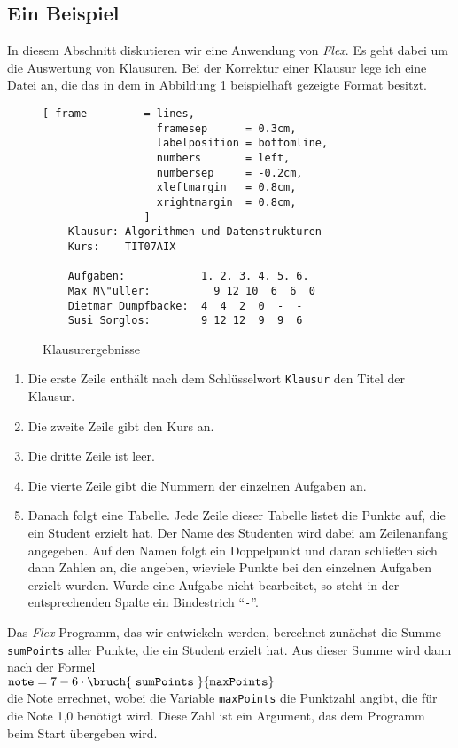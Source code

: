 \subsection{Ein Beispiel}
In diesem Abschnitt diskutieren wir eine Anwendung von \textsl{Flex}.  Es geht dabei um die
Auswertung von Klausuren.   Bei der Korrektur einer Klausur lege ich eine Datei an, die das in dem
in Abbildung \ref{fig:ergebnis} beispielhaft gezeigte Format besitzt.

\begin{figure}[!h]
\centering
\begin{Verbatim}[ frame         = lines, 
                  framesep      = 0.3cm, 
                  labelposition = bottomline,
                  numbers       = left,
                  numbersep     = -0.2cm,
                  xleftmargin   = 0.8cm,
                  xrightmargin  = 0.8cm,
                ]
    Klausur: Algorithmen und Datenstrukturen
    Kurs:    TIT07AIX
    
    Aufgaben:            1. 2. 3. 4. 5. 6.
    Max M\"uller:          9 12 10  6  6  0
    Dietmar Dumpfbacke:  4  4  2  0  -  -
    Susi Sorglos:        9 12 12  9  9  6
\end{Verbatim}
\vspace*{-0.3cm}
\caption{Klausurergebnisse}
\label{fig:ergebnis}
\end{figure}

\begin{enumerate}
\item Die erste Zeile enth\"alt nach dem Schl\"usselwort \texttt{Klausur} den Titel der Klausur.
\item Die zweite Zeile gibt den Kurs an.
\item Die dritte Zeile ist leer.
\item Die vierte Zeile gibt die Nummern der einzelnen Aufgaben an.
\item Danach folgt eine Tabelle.  Jede Zeile dieser Tabelle listet die Punkte auf,
      die ein Student erzielt hat.  Der Name des Studenten wird dabei am Zeilenanfang angegeben.
      Auf den Namen folgt ein Doppelpunkt und daran schlie{\ss}en sich dann Zahlen an, die angeben,
      wieviele Punkte bei den einzelnen Aufgaben erzielt wurden.  Wurde eine Aufgabe nicht
      bearbeitet, so steht in der entsprechenden Spalte ein Bindestrich ``\texttt{-}''.
\end{enumerate}
Das \textsl{Flex}-Programm, das wir entwickeln werden, berechnet zun\"achst die Summe
\texttt{sumPoints} aller Punkte, die ein Student erzielt hat.  Aus dieser Summe wird dann nach der
Formel 
\\[0.2cm]
\hspace*{1.3cm}
$\texttt{note} = 7 - 6 \cdot \bruch{\;\texttt{sumPoints}\;}{\texttt{maxPoints}}$
\\[0.2cm]
die Note errechnet, wobei die Variable \texttt{maxPoints} die  Punktzahl
angibt, die f\"ur die Note 1,0 ben\"otigt wird.  Diese Zahl ist ein Argument, das dem Programm
beim Start \"ubergeben wird. 

